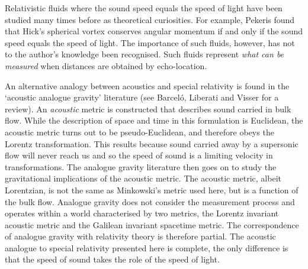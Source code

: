 Relativistic fluids where the sound speed equals the speed of light have been studied many times before
as theoretical curiosities\cite{Taub1978,Pekeris1976, Pekeris1977}.
For example, Pekeris found that Hick's spherical vortex conserves angular momentum if and only if
the sound speed equals the speed of light\cite{Pekeris1977}.
The importance of such fluids, however, has not to the author's knowledge been recognised.
Such fluids represent {\em what can be measured} when distances are obtained by echo-location.

An alternative  analogy between acoustics and special relativity is found in the `acoustic analogue gravity' literature (see Barcel{\'o}, Liberati and Visser\cite{Barcelo2005} for a review).
An {\em acoustic} metric is constructed that describes sound carried in bulk flow.
While the description of space and time in this formulation is Euclidean, the acoustic metric turns out to be pseudo-Euclidean,
and therefore obeys the Lorentz transformation.
This results because  sound carried away by a supersonic flow will never reach us
and so the speed of sound is a limiting velocity in transformations.
The analogue gravity literature then goes on to study the gravitational implications of the acoustic metric.
The acoustic metric, albeit Lorentzian, is not the same as Minkowski's metric used here, 
but is a function of the bulk flow.
Analogue gravity does not consider the measurement process and  operates within a world characterised by two metrics, 
the Lorentz invariant acoustic metric
 and the Galilean invariant spacetime  metric.
The correspondence of analogue gravity with relativity theory is therefore partial.
The acoustic analogue to special relativity presented here is complete,
the only difference is that the speed of sound takes the role of the speed of light.


